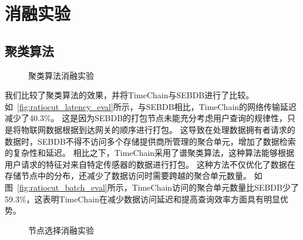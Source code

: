 \section{消融实验}
\subsection{聚类算法}
\begin{figure*}[t]
    \centering
	\begin{minipage}{0.96\linewidth}
        \caption{聚类算法消融实验} 
    \end{minipage}
\end{figure*}

我们比较了聚类算法的效果，并将TimeChain与SEBDB进行了比较。
如~\autoref{fig:ratiocut_latency_eval}所示，与SEBDB相比，TimeChain的网络传输延迟减少了40.3\%。
这是因为SEBDB的打包节点未能充分考虑用户查询的规律性，只是将物联网数据根据到达网关的顺序进行打包。
这导致在处理数据拥有者请求的数据时，SEBDB不得不访问多个存储提供商所管理的聚合单元，增加了数据检索的复杂性和延迟。
相比之下，TimeChain采用了谱聚类算法，这种算法能够根据用户请求的特征对来自特定传感器的数据进行打包。
这种方法不仅优化了数据在存储节点中的分布，还减少了数据访问时需要跨越的聚合单元数量。
如图~\autoref{fig:ratiocut_batch_eval}所示，TimeChain访问的聚合单元数量比SEBDB少了59.3\%，这表明TimeChain在减少数据访问延迟和提高查询效率方面具有明显优势。

\begin{figure*}[t]
    \centering
    \begin{minipage}{0.96\linewidth}
        \vspace{0.5ex}
        \caption{节点选择消融实验} 
    \end{minipage}
\end{figure*}

